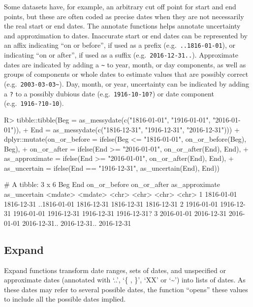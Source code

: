 \documentclass[
]{jss}
\begin{document}
Some datasets have, for example, an arbitrary cut off point for start
and end points, but these are often coded as precise dates when they are
not necessarily the real start or end dates. The annotate functions
helps annotate uncertainty and approximation to dates. Inaccurate start
or end dates can be represented by an affix indicating ``on or before'',
if used as a prefix (e.g.~\texttt{..1816-01-01}), or indicating ``on or
after'', if used as a suffix (e.g.~\texttt{2016-12-31..}). Approximate
dates are indicated by adding a \texttt{\textasciitilde{}} to year,
month, or day components, as well as groups of components or whole dates
to estimate values that are possibly correct
(e.g.~\texttt{2003-03-03\textasciitilde{}}). Day, month, or year,
uncertainty can be indicated by adding a \texttt{?} to a possibly
dubious date (e.g.~\texttt{1916-10-10?}) or date component
(e.g.~\texttt{1916-?10-10}).

\begin{CodeChunk}
\begin{CodeInput}
R> tibble::tibble(Beg = as_messydate(c("1816-01-01", "1916-01-01", "2016-01-01")),
+                End = as_messydate(c("1816-12-31", "1916-12-31", "2016-12-31"))) %
+   dplyr::mutate(on_or_before = ifelse(Beg <= "1816-01-01", on_or_before(Beg), Beg),
+                 on_or_after = ifelse(End >= "2016-01-01", on_or_after(End), End),
+                 as_approximate = ifelse(End >= "2016-01-01", on_or_after(End), End),
+                 as_uncertain = ifelse(End == "1916-12-31", as_uncertain(End), End))
\end{CodeInput}
\begin{CodeOutput}
# A tibble: 3 x 6
  Beg        End        on_or_before on_or_after  as_approximate as_uncertain
  <mdate>    <mdate>    <chr>        <chr>        <chr>          <chr>       
1 1816-01-01 1816-12-31 ..1816-01-01 1816-12-31   1816-12-31     1816-12-31  
2 1916-01-01 1916-12-31 1916-01-01   1916-12-31   1916-12-31     1916-12-31? 
3 2016-01-01 2016-12-31 2016-01-01   2016-12-31.. 2016-12-31..   2016-12-31  
\end{CodeOutput}
\end{CodeChunk}

\hypertarget{expand}{%
\subsection{Expand}\label{expand}}

Expand functions transform date ranges, sets of dates, and unspecified
or approximate dates (annotated with `..', `\{ , \}', `XX' or
`\textasciitilde{}') into lists of dates. As these dates may refer to
several possible dates, the function ``opens'' these values to include
all the possible dates implied.
\end{document}
